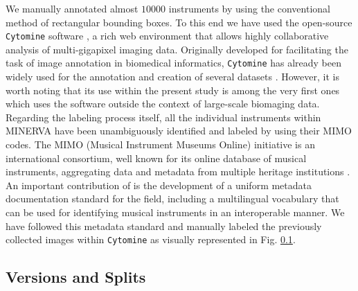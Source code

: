 We manually annotated almost $10000$ instruments by using the conventional method of rectangular bounding boxes. To this end we have used the open-source \texttt{Cytomine} software \cite{maree2016collaborative}, a rich web environment that allows highly collaborative analysis of multi-gigapixel imaging data. Originally developed for facilitating the task of image annotation in biomedical informatics, \texttt{Cytomine} has already been widely used for the annotation and creation of several datasets \cite{mormont2018comparison}. However, it is worth noting that its use within the present study is among the very first ones which uses the software outside the context of large-scale biomaging data. Regarding the labeling process itself, all the individual instruments within MINERVA have been unambiguously identified and labeled by using their MIMO codes. The MIMO (Musical Instrument Museums Online) initiative is an international consortium, well known for its online database of musical instruments, aggregating data and metadata from multiple heritage institutions \cite{dolan2017mimo}. An important contribution of \citet{dolan2017mimo} is the development of a uniform metadata documentation standard for the field, including a multilingual vocabulary that can be used for identifying musical instruments in an interoperable manner. We have followed this metadata standard and manually labeled the previously collected images within \texttt{Cytomine} as visually represented in Fig. \ref{}.

\subsection{Versions and Splits}

